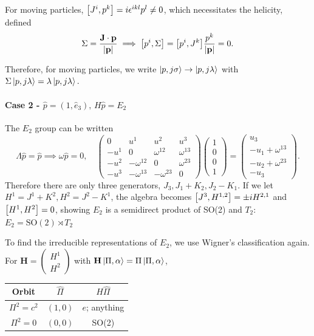 \documentclass{article}
\begin{document}
For moving particles, $\comm{J^i}{p^k}=i\epsilon^{ikl}p^l\ne 0$, which necessitates the helicity, defined 
$$\Sigma=\frac{\mathbf J\cdot\mathbf p}{\abs{\mathbf p}}\implies\comm{p^i}{\Sigma}=\comm{p^i}{J^k}\frac{p^k}{\abs{\mathbf p}}=0.$$

Therefore, for moving particles, we write $\ket{p,j\sigma}\to\ket{p,j\lambda}$ with $\Sigma\ket{p,j\lambda}=\lambda\ket{p,j\lambda}.$

\paragraph{Case 2 - $\hat p=(1,\hat e_3),\,H\hat p=E_2$} The $E_2$ group can be written 
$$\Lambda\hat p=\hat p\implies\omega\hat p=0,\quad\begin{pmatrix}0&u^1&u^2&u^3\\-u^1&0&\omega^{12}&\omega^{13}\\-u^2&-\omega^{12}&0&\omega^{23}\\-u^3&-\omega^{13}&-\omega^{23}&0\end{pmatrix}\begin{pmatrix}1\\0\\0\\1\end{pmatrix}=\begin{pmatrix}u_3\\-u_1+\omega^{13}\\-u_2+\omega^{23}\\-u_3\end{pmatrix}.$$
Therefore there are only three generators, $J_3,J_1+K_2,J_2-K_1$. If we let $H^1=J^1+K^2,H^2=J^2-K^1$, the algebra becomes $\comm{J^3}{H^{1,2}}=\pm iH^{2,1}$ and $\comm{H^1}{H^2}=0$, showing $E_2$ is a semidirect product of SO(2) and $T_2$: $E_2=\text{SO}(2)\rtimes T_2$

To find the irreducible representations of $E_2$, we use Wigner's classification again. For $\mathbf H=\begin{pmatrix}H^1\\H^2\end{pmatrix}$ with $\mathbf H\ket{\Pi,\alpha}=\Pi\ket{\Pi,\alpha}$, 
\begin{center}
\begin{tabular}{|c|c|c|}
     \hline
     Orbit & $\hat\Pi$ & $H\hat\Pi$\\
     \hline
     $\Pi^2=c^2$ & $(1,0)$ & $e$; anything\\
     \hline
     $\Pi^2=0$ & $(0,0)$ & SO(2)\\
     \hline
\end{tabular}
\end{center}
\end{document}
